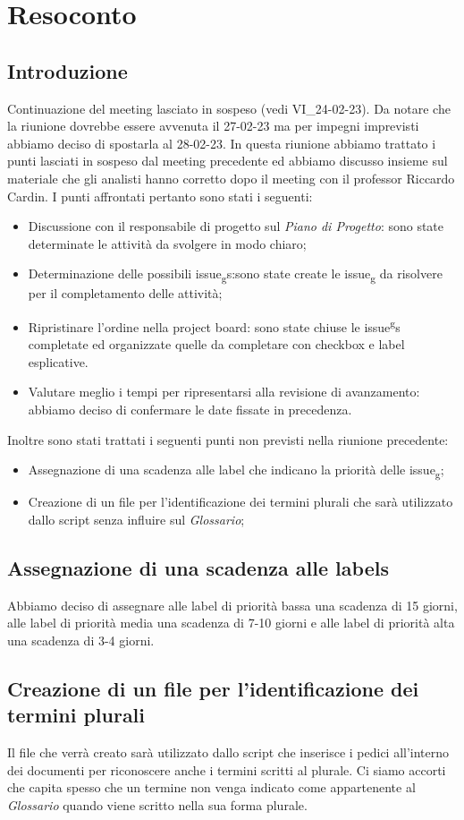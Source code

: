 \section{Resoconto}
\subsection{Introduzione}
Continuazione del meeting lasciato in sospeso (vedi VI\_24-02-23).
Da notare che la riunione dovrebbe essere avvenuta il 27-02-23 ma per impegni imprevisti abbiamo deciso di spostarla al 28-02-23.
In questa riunione abbiamo trattato i punti lasciati in sospeso dal meeting precedente ed abbiamo discusso insieme sul materiale che
gli analisti hanno corretto dopo il meeting con il professor Riccardo Cardin.
I punti affrontati pertanto sono stati i seguenti:
\begin{itemize}
    \item Discussione con il responsabile di progetto sul \textit{Piano di Progetto}: sono state determinate le attività da svolgere in modo chiaro;
    \item Determinazione delle possibili issue\textsubscript{g}s:sono state create le issue\textsubscript{g} da risolvere per il completamento delle attività;
    \item Ripristinare l'ordine nella project board: sono state chiuse le issue\textsuperscript{g}s completate ed organizzate quelle da completare con checkbox e label esplicative.
    \item Valutare meglio i tempi per ripresentarsi alla revisione di avanzamento: abbiamo deciso di confermare le date fissate in precedenza.
    \end{itemize}
Inoltre sono stati trattati i seguenti punti non previsti nella riunione precedente:
\begin{itemize}
\item Assegnazione di una scadenza alle label che indicano la priorità delle issue\textsubscript{g};
\item Creazione di un file per l'identificazione dei termini plurali che sarà utilizzato dallo script senza influire sul \textit{Glossario};
\end{itemize}
\subsection{Assegnazione di una scadenza alle labels}
Abbiamo deciso di assegnare alle label di priorità bassa una scadenza di 15 giorni, alle label di priorità media una scadenza di 7-10 giorni e alle 
label di priorità alta una scadenza di 3-4 giorni.
\subsection{Creazione di un file per l'identificazione dei termini plurali}
Il file che verrà creato sarà utilizzato dallo script che inserisce i pedici all'interno dei documenti per riconoscere anche i termini scritti al 
plurale. Ci siamo accorti che capita spesso che un termine non venga indicato come appartenente al \textit{Glossario} quando viene scritto nella 
sua forma plurale.
